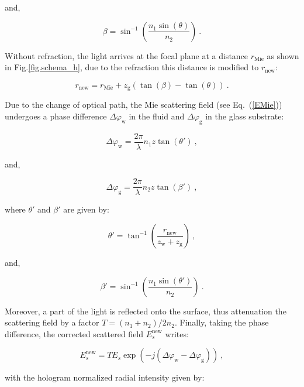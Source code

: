 and,

\begin{equation}
	\beta = \sin ^{-1} \left(\frac{n_1 \sin (\theta)}{n_2}\right) ~.
\end{equation}

Without refraction, the light arrives at the focal plane at a distance $r_\mathrm{Mie}$ as shown in Fig.\ref{fig.schema_h}, due to the refraction this distance is modified to $r_\mathrm{new}$:

\begin{equation}
	r_\mathrm{new} = r_\mathrm{Mie} + z_\mathrm{g}(\tan(\beta) - \tan(\theta)) ~.
\end{equation}

Due to the change of optical path, the Mie scattering field (see Eq.~(\ref{EMie})) undergoes a phase difference $\Delta \varphi_\mathrm{w}$ in the fluid  and  $\Delta \varphi_\mathrm{g}$ in the glass substrate:

\begin{equation}
	\Delta \varphi_\mathrm{w} = \frac{2 \pi}{\lambda} n_1 z \tan(\theta ')~,
\end{equation}

and,

\begin{equation}
	\Delta \varphi_\mathrm{g} = \frac{2 \pi}{\lambda} n_2 z \tan(\beta ')~,
\end{equation}

where $\theta '$ and $\beta '$ are given by:

\begin{equation}
	\theta ' = \tan ^{-1} \left( \frac{r_\mathrm{new}}{z_\mathrm{w} + z_\mathrm{g}}\right) ~,
\end{equation}

and,

\begin{equation}
	\beta ' = \sin ^{-1} \left(\frac{n_1 \sin (\theta ')}{n_2}\right) ~.
\end{equation}

Moreover, a part of the light is reflected onto the surface, thus attenuation the scattering field by a factor $T = (n_1+n_2) / 2n_2$. Finally, taking the phase difference, the corrected scattered field $E^\mathrm{new} _s$ writes:

\begin{equation}
	E_s^\mathrm{new} = TE_s \exp(-j(\Delta \varphi_\mathrm{w} - \Delta \varphi_\mathrm{g})) ~,
\end{equation}

with the hologram normalized radial intensity given by:

